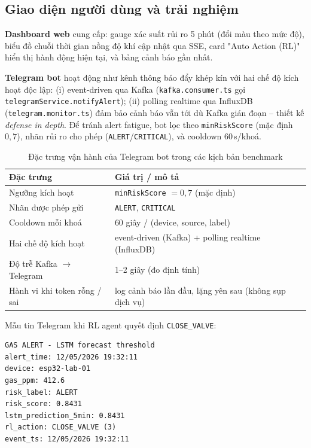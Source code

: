 \subsection{Giao diện người dùng và trải nghiệm}

\textbf{Dashboard web} cung cấp: gauge xác suất rủi ro 5 phút (đổi màu theo mức độ), biểu đồ chuỗi thời gian nồng độ khí cập nhật qua SSE, card "Auto Action (RL)" hiển thị hành động hiện tại, và bảng cảnh báo gần nhất.

\textbf{Telegram bot} hoạt động như kênh thông báo đẩy khép kín với hai chế độ kích hoạt độc lập: (i) event-driven qua Kafka (\texttt{kafka.consumer.ts} gọi \texttt{telegramService.notifyAlert}); (ii) polling realtime qua InfluxDB (\texttt{telegram.monitor.ts}) đảm bảo cảnh báo vẫn tới dù Kafka gián đoạn -- thiết kế \emph{defense in depth}. Để tránh alert fatigue, bot lọc theo \texttt{minRiskScore} (mặc định $0{,}7$), nhãn rủi ro cho phép (\texttt{ALERT}/\texttt{CRITICAL}), và cooldown 60\,s/khoá.

\begin{table}[H]
\centering
\caption{Đặc trưng vận hành của Telegram bot trong các kịch bản benchmark}
\label{tab:telegram_config}
\begin{tabular}{lp{7.5cm}}
\toprule
\textbf{Đặc trưng} & \textbf{Giá trị / mô tả} \\
\midrule
Ngưỡng kích hoạt    & \texttt{minRiskScore} $= 0{,}7$ (mặc định) \\
Nhãn được phép gửi  & \texttt{ALERT}, \texttt{CRITICAL} \\
Cooldown mỗi khoá   & 60 giây / (device, source, label) \\
Hai chế độ kích hoạt & event-driven (Kafka) + polling realtime (InfluxDB) \\
Độ trễ Kafka $\rightarrow$ Telegram & 1--2 giây (đo định tính) \\
Hành vi khi token rỗng / sai & log cảnh báo lần đầu, lặng yên sau (không sụp dịch vụ) \\
\bottomrule
\end{tabular}
\end{table}

Mẫu tin Telegram khi RL agent quyết định \texttt{CLOSE\_VALVE}:

\begin{lstlisting}[caption={Mẫu tin nhắn Telegram trong kịch bản LEAK\_FAST}, label={lst:telegram_payload}]
GAS ALERT - LSTM forecast threshold
alert_time: 12/05/2026 19:32:11
device: esp32-lab-01
gas_ppm: 412.6
risk_label: ALERT
risk_score: 0.8431
lstm_prediction_5min: 0.8431
rl_action: CLOSE_VALVE (3)
event_ts: 12/05/2026 19:32:11
\end{lstlisting}

